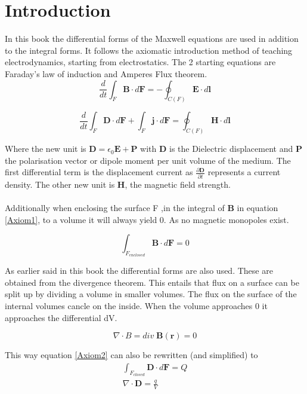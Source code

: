 \chapter{Introduction}

In this book the differential forms of the Maxwell equations are used in addition to the integral forms. It follows the axiomatic introduction method of teaching electrodynamics, starting from electrostatics. The 2 starting equations are Faraday's law of induction and Amperes Flux theorem.
\begin{equation}
    \frac{d}{dt}\int_F \textbf{B}\cdot d\textbf{F} = - \oint_{C(F)}\textbf{E}\cdot d\textbf{l}
    \label{Axiom1}
\end{equation}

\begin{equation}
    \frac{d}{dt} \int_F \textbf{D} \cdot d \textbf{F} + \int_F \textbf{j} \cdot d \textbf{F} = \oint_{C(F)} \textbf{H} \cdot d \textbf{l}
    \label{Axiom2}
\end{equation}

Where the new unit is $\textbf{D}= \epsilon_0 \textbf{E}+\textbf{P}$ with \textbf{D} is the Dielectric displacement and \textbf{P} the polarisation vector or dipole moment per unit volume of the medium. The first differential term is the displacement current as $\frac{\partial \textbf{D}}{\partial t}$ represents a current density. The other new unit is \textbf{H}, the magnetic field strength.\\
\\
Additionally when enclosing the surface F ,in the integral of \textbf{B} in equation \ref{Axiom1}, to a volume it will always yield 0. As no magnetic monopoles exist. 

\begin{equation}
    \int_{F_{enclosed}} \textbf{B} \cdot d\textbf{F} = 0
\end{equation}

As earlier said in this book the differential forms are also used. These are obtained from the divergence theorem. This entails that flux on a surface can be split up by dividing a volume in smaller volumes. The flux on the surface of the internal volumes cancle on the inside. When the volume approaches 0 it approaches the differential dV. 

\begin{equation}
    \nabla \cdot B = div\; \textbf{B}(\textbf{r}) = 0
\end{equation}

This way equation \ref{Axiom2} can also be rewritten (and simplified) to 
\begin{equation}
    \begin{aligned}
        \int_{F_{closed}}\textbf{D} \cdot d\textbf{F} = Q\\
        \nabla \cdot \textbf{D} = \frac{q}{V}
    \end{aligned}
\end{equation}

